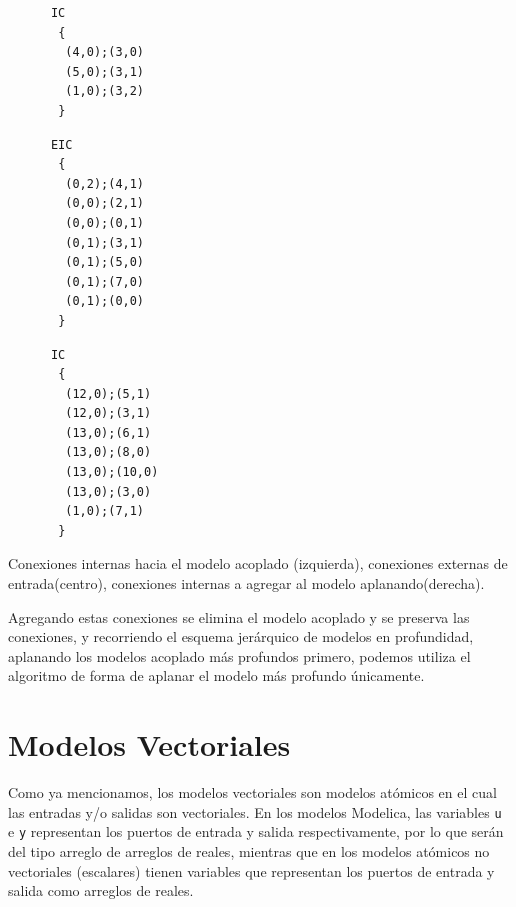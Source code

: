 \begin{itemize}
\begin{listing}
\begin{minipage}[t]{0.3\linewidth}
\begin{verbatim}
      IC
       {
        (4,0);(3,0)
        (5,0);(3,1)
        (1,0);(3,2)
       }
\end{verbatim}
\end{minipage}
\begin{minipage}[t]{0.3\linewidth}
\begin{verbatim}
      EIC
       {
        (0,2);(4,1)
        (0,0);(2,1)
        (0,0);(0,1)
        (0,1);(3,1)
        (0,1);(5,0)
        (0,1);(7,0)
        (0,1);(0,0)
       }
\end{verbatim}
\end{minipage}
\begin{minipage}[t]{0.3\linewidth}
\begin{verbatim}
      IC
       {
        (12,0);(5,1)
        (12,0);(3,1)
        (13,0);(6,1)
        (13,0);(8,0)
        (13,0);(10,0)
        (13,0);(3,0)
        (1,0);(7,1)
       }
\end{verbatim}
\end{minipage}
\label{lst:conexiones3}
\caption{Conexiones internas hacia el modelo acoplado (izquierda), conexiones externas de entrada(centro), conexiones internas a agregar al modelo aplanando(derecha).}
\end{listing}
\end{itemize}

	Agregando estas conexiones se elimina el modelo acoplado y se preserva las conexiones, y recorriendo el esquema jerárquico de modelos en profundidad, 
	aplanando los modelos acoplado más profundos primero, podemos utiliza el algoritmo de forma de aplanar el modelo más profundo únicamente.

\section{Modelos Vectoriales} \label{sec:modelos_vectoriales}
	Como ya mencionamos, los modelos vectoriales son modelos atómicos en el cual las entradas y/o salidas son vectoriales. En los modelos Modelica, 
	las variables \texttt{u} e \texttt{y} representan los puertos de entrada y salida respectivamente, por lo que serán del tipo arreglo de arreglos de reales,
	mientras que en los modelos atómicos no vectoriales (escalares) tienen variables que representan los puertos de entrada y salida como arreglos de reales. 

